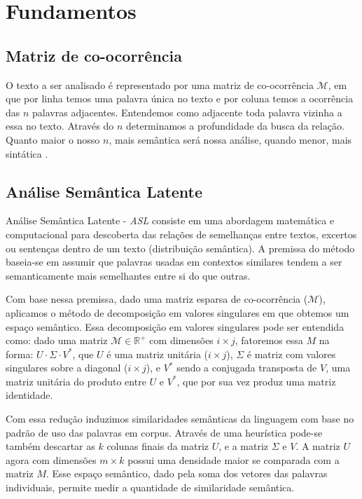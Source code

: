 \documentclass[11pt]{article}
\begin{document}
\section{Fundamentos} \label{sec:fundamentos}

\subsection{Matriz de co-ocorrência}\vspace{-0.1cm}

O texto a ser analisado é representado por uma matriz de co-ocorrência $\mathcal{M}$, em que por linha temos uma palavra única no texto e por coluna temos a ocorrência das $n$ palavras adjacentes. Entendemos como adjacente toda palavra vizinha a essa no texto. Através do $n$ determinamos a profundidade da busca da relação. Quanto maior o nosso $n$, mais semântica será nossa análise, quando menor, mais sintática \cite{daniel:2000}.

\subsection{Análise Semântica Latente}\vspace{-0.1cm}

Análise Semântica Latente - \textit{ASL} consiste em uma abordagem matemática e computacional para descoberta das relações de semelhanças entre textos, excertos ou sentenças dentro de um texto (distribuição semântica). A premissa do método baseia-se em assumir que palavras usadas em contextos similares tendem a ser semanticamente mais semelhantes entre si do que outras.

Com base nessa premissa, dado uma matriz esparsa de co-ocorrência ($\mathcal{M}$), aplicamos o método de decomposição em valores singulares em que obtemos um espaço semântico. Essa decomposição em valores singulares pode ser entendida como: dado uma matriz $\mathcal{M} \in \mathbb{R}^{+}$ com dimensões $i \times j$, fatoremos essa $M$ na forma: $U \cdot \Sigma \cdot V^{*}$, que $U$ é uma matriz unitária ($i \times j$), $\Sigma$ é matriz com valores singulares sobre a diagonal ($i \times j$), e $V^{*}$ sendo a conjugada transposta de $V$, uma matriz unitária do produto entre $U$ e $V^{*}$, que por sua vez produz uma matriz identidade.

Com essa redução induzimos similaridades semânticas da linguagem com base no padrão de uso das palavras em corpus. Através de uma heurística pode-se também descartar as $k$ colunas finais da matriz $U$, e a matriz $\Sigma$ e $V$. A matriz $U$ agora com dimensões $m \times k$ possui uma densidade maior se comparada com a matriz $M$. Esse espaço semântico, dado pela soma dos vetores das palavras individuais, permite medir a quantidade de similaridade semântica.
\end{document}
